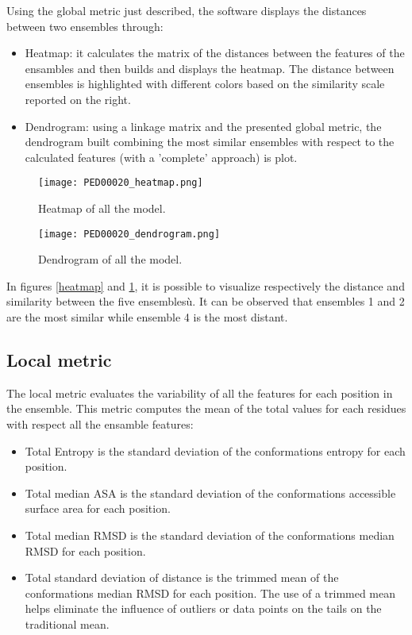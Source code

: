 Using the global metric just described, the software displays the distances between two ensembles through:
\begin{itemize}
\item Heatmap: it calculates the matrix of the distances between the features of the ensambles and then builds and displays the heatmap. The distance between ensembles is highlighted with different colors based on the similarity scale reported on the right. 
\item Dendrogram: using a linkage matrix and the presented global metric, the dendrogram built combining the most similar ensembles with respect to the calculated features (with a 'complete' approach) is plot.
\end{itemize}

\begin{figure}[H]
	\begin{minipage}[b]{0.93\textwidth}
		\centering
		\texttt{[image: PED00020\_heatmap.png]}
		\caption{Heatmap of all the model.}
		\label{heatmap}
	\end{minipage}
	\begin{minipage}[b]{0.93\textwidth}
		\centering
		\texttt{[image: PED00020\_dendrogram.png]}
		\caption{Dendrogram of all the model.}
		\label{dendrogram}
	\end{minipage}
\end{figure}

In figures \ref{heatmap} and \ref{dendrogram}, it is possible to visualize respectively the distance and similarity between the five ensemblesù. It can be observed that ensembles 1 and 2 are the most similar while ensemble 4 is the most distant.


\subsection{Local metric}
The local metric evaluates the variability of all the features for each position in the ensemble.
This metric computes the mean of the total values for each residues with respect all the ensamble features: %
\begin{itemize}
\item Total Entropy is the standard deviation of the conformations entropy for each position.
\item Total median ASA is the standard deviation of the conformations accessible surface area for each position.
\item Total median RMSD is the standard deviation of the conformations median RMSD for each position.
\item Total standard deviation of distance is the trimmed mean of the conformations median RMSD for each position. 
The use of a trimmed mean helps eliminate the influence of outliers or data points on the tails on the traditional mean.
\end{itemize}


